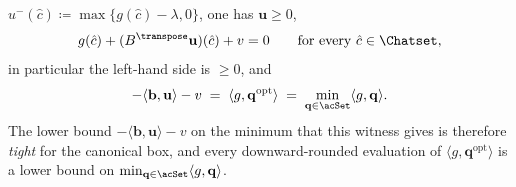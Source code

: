 \begin{theorem}
\begin{enumerate}[label=(\roman*),leftmargin=2.2em]
$u^{-}(\hat c)\coloneqq\max\{g(\hat c)-\lambda,0\}$, one has
$\mathbf{u}\ge0$,
\begin{equation}\label{eq:dualfeas}
  g(\hat c)+(B^{\transpose}\mathbf{u})(\hat c)+v=0
  \qquad\text{for every }\hat c\in\Chatset,
\end{equation}
in particular the left-hand side is $\ge0$, and
\begin{equation}\label{eq:dualvalue}
  -\langle\mathbf{b},\mathbf{u}\rangle-v
  \;=\;\langle g,\mathbf{q}^{\mathrm{opt}}\rangle
  \;=\;\min_{\mathbf{q}\in\acSet}\langle g,\mathbf{q}\rangle .
\end{equation}
The lower bound $-\langle\mathbf{b},\mathbf{u}\rangle-v$ on the minimum that
this witness gives is therefore \emph{tight} for the canonical box, and every
downward-rounded evaluation of $\langle g,\mathbf{q}^{\mathrm{opt}}\rangle$ is
a lower bound on $\min_{\mathbf{q}\in\acSet}\langle g,\mathbf{q}\rangle$.
\end{enumerate}
\end{theorem}

